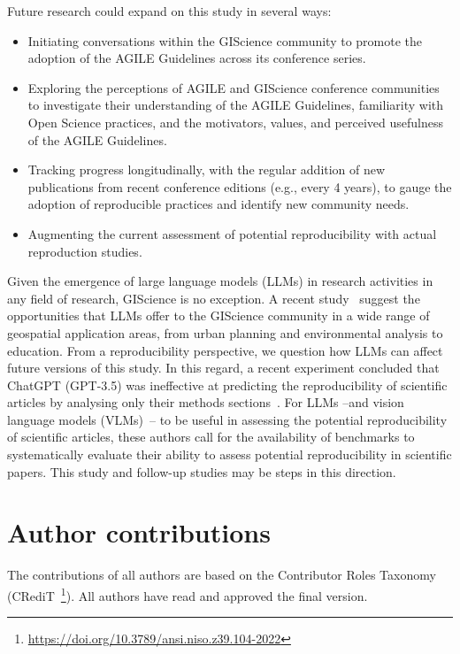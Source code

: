 \documentclass{josis}
\begin{document}
Future research could expand on this study in several ways:
\begin{itemize}
    
    \item Initiating conversations within the GIScience community to promote the adoption of the AGILE Guidelines across its conference series.

    \item Exploring the perceptions of AGILE and GIScience conference communities to investigate their understanding of the AGILE Guidelines, familiarity with Open Science practices, and the motivators, values, and perceived usefulness of the AGILE Guidelines.

    \item Tracking progress longitudinally, with the regular addition of new publications from recent conference editions (e.g., every 4 years), to gauge the adoption of reproducible practices and identify new community needs.

    \item Augmenting the current assessment of potential reproducibility with actual reproduction studies.
\end{itemize}

Given the emergence of large language models (LLMs) in research activities in any field of research, GIScience is no exception. A recent study~\cite{VandeWeghe2025_LLMs} suggest the opportunities that LLMs offer to the GIScience community in a wide range of geospatial application areas, from urban planning and environmental analysis to education. From a reproducibility perspective, we question how LLMs can affect future versions of this study. In this regard, a recent experiment concluded that ChatGPT (GPT-3.5) was ineffective at predicting the reproducibility of scientific articles by analysing only their methods sections~\cite{ChangNordling2025}. For LLMs --and vision language models (VLMs)~\cite{koukouraki2025}-- to be useful in assessing the potential reproducibility of scientific articles, these authors call for the availability of benchmarks to systematically evaluate their ability to assess potential reproducibility in scientific papers. This study and follow-up studies may be steps in this direction.

\section*{Author contributions}

The contributions of all authors are based on the Contributor Roles Taxonomy (CRediT~\footnote{\url{https://doi.org/10.3789/ansi.niso.z39.104-2022}}). All authors have read and approved the final version. \\
\end{document}
